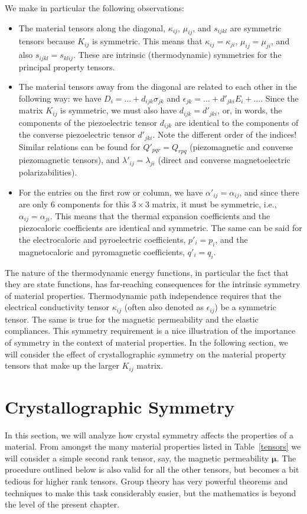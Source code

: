 We make in particular the following observations:
\begin{itemize}
	\item The material tensors along the diagonal, $\kappa_{ij}$, $\mu_{ij}$, and $s_{ijkl}$ are symmetric tensors because $K_{ij}$ is symmetric.  This means that $\kappa_{ij}=\kappa_{ji}$, $\mu_{ij}=\mu_{ji}$, and also $s_{ijkl} = s_{klij}$.  These are intrinsic (thermodynamic) symmetries for the principal property tensors.
	
	\item The material tensors away from the diagonal are related to each other in the following way:  we have $D_i = \ldots + d_{ijk}\sigma_{jk}$ and $\epsilon_{jk} = \ldots +d'_{jki}E_i+\ldots$.  Since the matrix $K_{ij}$ is symmetric, we must also have $d_{ijk} = d'_{jki}$, or, in words, the components of the piezoelectric tensor $d_{ijk}$ are identical to the components of the converse piezoelectric tensor $d'_{jki}$.  Note the different order of the indices!  Similar relations can be found for $Q'_{pqr} = Q_{rpq}$ (piezomagnetic and converse piezomagnetic tensors), and $\lambda'_{ij} = \lambda_{ji}$ (direct and converse magnetoelectric polarizabilities).  
	
	\item For the entries on the first row or column, we have $\alpha'_{ij} = \alpha_{ij}$, and since there are only $6$ components for this $3\times 3$ matrix, it must be symmetric, i.e., $\alpha_{ij}=\alpha_{ji}$.  This means that the thermal expansion coefficients and the piezocaloric coefficients are identical and symmetric.  The same can be said for the electrocaloric and pyroelectric coefficients, $p'_i = p_i$, and the magnetocaloric and pyromagnetic coefficients, $q'_i=q_i$.  
\end{itemize}
The nature of the thermodynamic energy functions, in particular the fact that they are state functions, has far-reaching consequences for the intrinsic symmetry of material properties. Thermodynamic path independence requires that the electrical conductivity tensor $\kappa_{ij}$ (often also denoted as $\epsilon_{ij}$) be a symmetric tensor.  The same is true for the magnetic permeability and the elastic compliances.  This symmetry requirement is a nice illustration of the importance of symmetry in the context of material properties.  In the following section, we will consider the effect of crystallographic symmetry on the material property tensors that make up the larger $K_{ij}$ matrix.

\section{Crystallographic Symmetry}
In this section, we will analyze how crystal symmetry affects the properties of a material.  From amongst the many material properties listed in Table~\ref{tensors} we will consider a simple second rank tensor, say, the magnetic permeability $\bm{\mu}$.  The procedure outlined below is also valid for all the other tensors, but becomes a bit tedious for higher rank tensors. Group theory has very powerful theorems and techniques to make this task considerably easier, but the mathematics is beyond the level of the present chapter.

